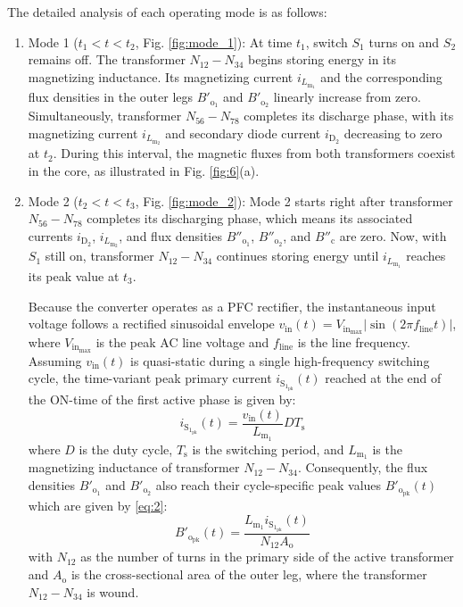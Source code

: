 \documentclass[lettersize,journal]{IEEEtran}
\begin{document}
The detailed analysis of each operating mode is as follows:

\begin{enumerate}
    \item Mode 1 ($t_1 < t < t_2$, Fig. \ref{fig:mode_1}): At time $t_1$, switch $S_1$ turns on and $S_2$ remains off. The transformer $N_{12}-N_{34}$ begins storing energy in its magnetizing inductance. Its magnetizing current $i_{L_{\mathrm{m}_1}}$ and the corresponding flux densities in the outer legs $B'_{\mathrm{o}_1}$ and $B'_{\mathrm{o}_2}$ linearly increase from zero. Simultaneously, transformer $N_{56}-N_{78}$ completes its discharge phase, with its magnetizing current $i_{L_{\mathrm{m}_2}}$ and secondary diode current $i_{\mathrm{D}_2}$ decreasing to zero at $t_2$. During this interval, the magnetic fluxes from both transformers coexist in the core, as illustrated in Fig. \ref{fig:6}(a).

    \item Mode 2 ($t_2 < t < t_3$, Fig. \ref{fig:mode_2}): Mode 2 starts right after transformer $N_{56}-N_{78}$ completes its discharging phase, which means its associated currents $i_{\mathrm{D}_2}$, $i_{L_{\mathrm{m}_2}}$, and flux densities $B''_{\mathrm{o}_1}$, $B''_{\mathrm{o}_2}$, and $B''_{\mathrm{c}}$ are zero. Now, with $S_1$ still on, transformer $N_{12}-N_{34}$ continues storing energy until $i_{L_{\mathrm{m}_1}}$ reaches its peak value at $t_3$. 
    
    \vspace{\baselineskip}
    Because the converter operates as a PFC rectifier, the instantaneous input voltage follows a rectified sinusoidal envelope $v_{\mathrm{in}}(t) = V_{\mathrm{in}_{\mathrm{max}}} |\sin(2\pi f_{\mathrm{line}} t)|$, where $V_{\mathrm{in}_{\mathrm{max}}}$ is the peak AC line voltage and $f_{\mathrm{line}}$ is the line frequency. Assuming $v_{\mathrm{in}}(t)$ is quasi-static during a single high-frequency switching cycle, the time-variant peak primary current $i_{\mathrm{S}_{1_{\mathrm{pk}}}}(t)$ reached at the end of the ON-time of the first active phase is given by:
    \begin{equation}
    \label{eq:1}
    i_{\mathrm{S}_{1_{\mathrm{pk}}}}(t) = \frac{v_{\mathrm{in}}(t)}{L_{\mathrm{m}_1}} D T_{\mathrm{s}} 
    \end{equation}
    where $D$ is the duty cycle, $T_{\mathrm{s}}$ is the switching period, and $L_{\mathrm{m}_1}$ is the magnetizing inductance of transformer $N_{12}-N_{34}$. Consequently, the flux densities $B'_{\mathrm{o}_1}$ and $B'_{\mathrm{o}_2}$ also reach their cycle-specific peak values $B'_{\mathrm{o}_{\mathrm{pk}}}(t)$ which are given by \eqref{eq:2}:
    \begin{equation}
    \label{eq:2}
    B'_{\mathrm{o}_{\mathrm{pk}}}(t) = \frac{L_{\mathrm{m}_1} i_{\mathrm{S}_{1_{\mathrm{pk}}}}(t)}{N_{12} A_{\mathrm{o}}} 
    \end{equation}
    with $N_{12}$ as the number of turns in the primary side of the active transformer and $A_{\mathrm{o}}$ is the cross-sectional area of the outer leg, where the transformer $N_{12}-N_{34}$ is wound.


\end{enumerate}
\end{document}
